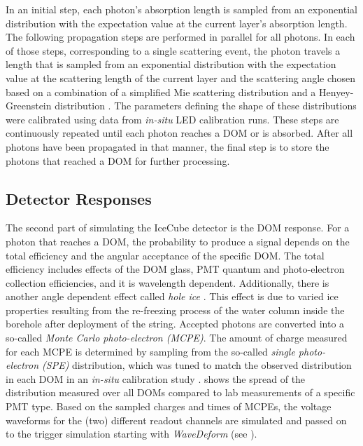 In an initial step, each photon's absorption length is sampled from an exponential distribution with the expectation value at the current layer's absorption length. The following propagation steps are performed in parallel for all photons. In each of those steps, corresponding to a single scattering event, the photon travels a length that is sampled from an exponential distribution with the expectation value at the scattering length of the current layer and the scattering angle chosen based on a combination of a simplified Mie scattering distribution  and a Henyey-Greenstein distribution  . The parameters defining the shape of these distributions were calibrated using data from \textit{in-situ} LED calibration runs. These steps are continuously repeated until each photon reaches a DOM or is absorbed. After all photons have been propagated in that manner, the final step is to store the photons that reached a DOM for further processing.


\subsection{Detector Responses}

The second part of simulating the IceCube detector is the DOM response. For a photon that reaches a DOM, the probability to produce a signal depends on the total efficiency and the angular acceptance of the specific DOM. The total efficiency includes effects of the DOM glass, PMT quantum and photo-electron collection efficiencies, and it is wavelength dependent. Additionally, there is another angle dependent effect called \textit{hole ice} . This effect is due to varied ice properties resulting from the re-freezing process of the water column inside the borehole after deployment of the string. Accepted photons are converted into a so-called \textit{Monte Carlo photo-electron (MCPE)}. The amount of charge measured for each MCPE is determined by sampling from the so-called \textit{single photo-electron (SPE)} distribution, which was tuned to match the observed distribution in each DOM in an \textit{in-situ} calibration study .  shows the spread of the distribution measured over all DOMs compared to lab measurements of a specific PMT type. Based on the sampled charges and times of MCPEs, the voltage waveforms for the (two) different readout channels are simulated and passed on to the trigger simulation starting with \textit{WaveDeform} (see ).

